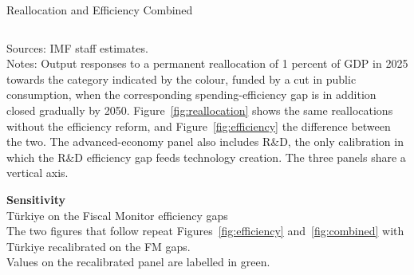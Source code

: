 \documentclass[aspectratio=169, 11pt, t]{beamer}
\begin{document}
\begin{frame}{Reallocation and Efficiency Combined}
    \vspace{0.2em}
    \label{fig:combined}
    \begin{columns}[T]
    \end{columns}

    \vfill
    {\fontsize{5pt}{6pt}\selectfont
        Sources: IMF staff estimates. \\
        Notes: Output responses to a permanent reallocation of 1 percent of GDP in 2025 towards the category indicated by the colour, funded by a cut in public consumption, when the corresponding spending-efficiency gap is in addition closed gradually by 2050. Figure~\ref{fig:reallocation} shows the same reallocations without the efficiency reform, and Figure~\ref{fig:efficiency} the difference between the two. The advanced-economy panel also includes R\&D, the only calibration in which the R\&D efficiency gap feeds technology creation. The three panels share a vertical axis. \\
    }
\end{frame}

\begin{frame}[plain]
    \vfill
    \begin{center}
        {\Large\bfseries\color{MyBlue} Sensitivity}\\[0.8em]
        {\large Türkiye on the Fiscal Monitor efficiency gaps}\\[1.4em]
        {\footnotesize The two figures that follow repeat Figures~\ref{fig:efficiency}
        and~\ref{fig:combined} with Türkiye recalibrated on the FM gaps.\\
        Values on the recalibrated panel are labelled in green.}
    \end{center}
    \vfill
\end{frame}
\end{document}
